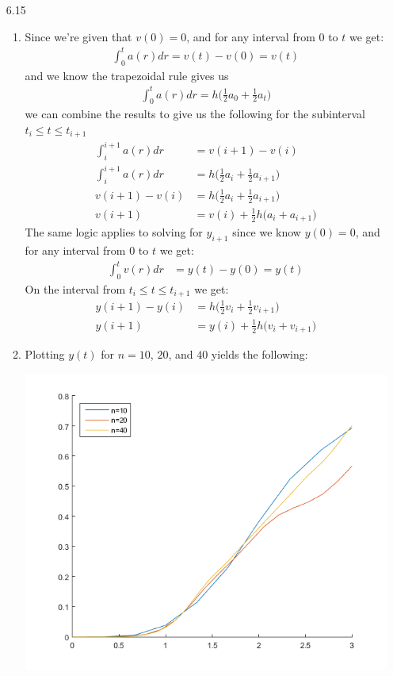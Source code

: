 \documentclass[11pt,a4paper]{article}
\begin{document}
\begin{itemize}
			\item[6.15]
				\begin{enumerate} [label={\alph*)}]
					\item Since we're given that $v(0) = 0$, and for any interval from $0$ to $t$ we get:
					\begin{align*}
					\int_{0}^{t} a(r)dr = v(t) - v(0) = v(t)
					\end{align*}
					and we know the trapezoidal rule gives us
					\begin{align*}
					\int_{0}^{t} a(r)dr = h\Big(\frac{1}{2}a_0 + \frac{1}{2}a_{t}\Big)
					\end{align*}
					we can combine the results to give us the following for the subinterval $t_i\leq t \leq t_{i+1}$
					\begin{align*}
					\int_{i}^{i+1} a(r)dr &= v(i+1) - v(i)\\
					\int_{i}^{i+1} a(r)dr &= h\Big(\frac{1}{2}a_i + \frac{1}{2}a_{i+1}\Big) \\
					v(i+1) - v(i) &= h\Big(\frac{1}{2}a_i + \frac{1}{2}a_{i+1}\Big)\\
					v(i+1) &= v(i) + \frac{1}{2}h\Big(a_i + a_{i+1}\Big)
					\end{align*}
					The same logic applies to solving for $y_{i+1}$ since we know $y(0) = 0$, and for any interval from $0$ to $t$ we get:
					\begin{align*}
					\int_{0}^{t} v(r)dr &= y(t) - y(0) = y(t)
					\end{align*}
					On the interval from $t_i\leq t \leq t_{i+1}$ we get:
					\begin{align*}
					y(i+1) - y(i) &= h\Big(\frac{1}{2}v_i + \frac{1}{2}v_{i+1}\Big)\\
					y(i+1) &= y(i) + \frac{1}{2}h\Big(v_i + v_{i+1}\Big)
					\end{align*}
					\item Plotting $y(t)$ for $n=10$, $20$, and $40$ yields the following:
					\begin{center}
						\includegraphics[width=.75\linewidth]{ch6q15b}

\end{center}
\end{enumerate}
\end{itemize}
\end{document}
